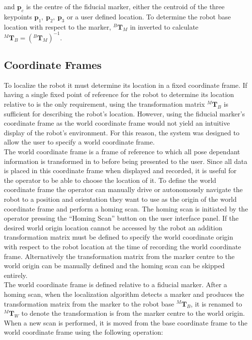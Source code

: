 \noindent and $\mathbf{p}_c$ is the centre of the fiducial marker, either the centroid of the three keypoints $\mathbf{p}_1,\ \mathbf{p}_2,\ \mathbf{p}_3$ or a user defined location. To determine the robot base location with respect to the marker, $^{B}\mathbf{T}_{M}$ in inverted to calculate $^{M}\mathbf{T}_{B} = (^{B}\mathbf{T}_{M})^{-1}$.\\

\subsection{Coordinate Frames}

To localize the robot it must determine its location in a fixed coordinate frame. If having a single fixed point of reference for the robot to determine its location relative to is the only requirement, using the transformation matrix $^{M}\mathbf{T}_{B}$ is sufficient for describing the robot's location. However, using the fiducial marker's coordinate frame as the world coordinate frame would not yield an intuitive display of the robot's environment. For this reason, the system was designed to allow the user to specify a world coordinate frame.\\

The world coordinate frame is a frame of reference to which all pose dependant information is transformed in to before being presented to the user. Since all data is placed in this coordinate frame when displayed and recorded, it is useful for the operator to be able to choose the location of it. To define the world coordinate frame the operator can manually drive or autonomously navigate the robot to a position and orientation they want to use as the origin of the world coordinate frame and perform a homing scan. The homing scan is initiated by the operator pressing the ``Homing Scan'' button on the user interface panel. If the desired world origin location cannot be accessed by the robot an addition transformation matrix must be defined to specify the world coordinate origin with respect to the robot location at the time of recording the world coordinate frame. Alternatively the transformation matrix from the marker centre to the world origin can be manually defined and the homing scan can be skipped entirely.\\

The world coordinate frame is defined relative to a fiducial marker. After a homing scan, when the localization algorithm detects a marker and produces the transformation matrix from the marker to the robot base $^{M}\mathbf{T}_{B}$, it is renamed to $^{M}\mathbf{T}_{W}$ to denote the transformation is from the marker centre to the world origin. When a new scan is performed, it is moved from the base coordinate frame to the world coordinate frame using the following operation:

